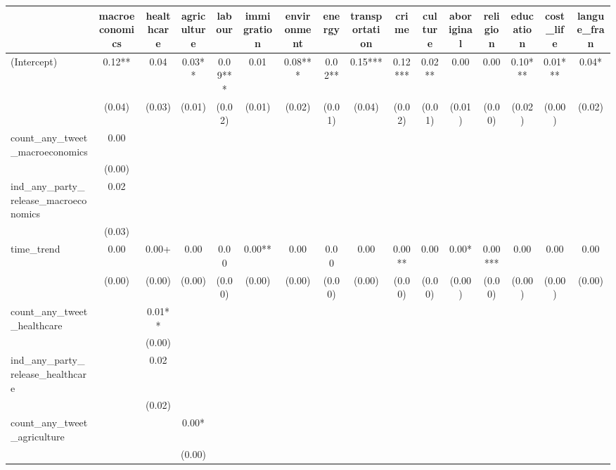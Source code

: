 \begin{table}
\centering
\begin{tabular}[t]{lccccccccccccccc}
\toprule
  & macroeconomics & healthcare & agriculture & labour & immigration & environment & energy & transportation & crime & culture & aboriginal & religion & education & cost\_life & langue\_fran\\
\midrule
(Intercept) & \num{0.12}** & \num{0.04} & \num{0.03}** & \num{0.09}*** & \num{0.01} & \num{0.08}*** & \num{0.02}** & \num{0.15}*** & \num{0.12}*** & \num{0.02}** & \num{0.00} & \num{0.00} & \num{0.10}*** & \num{0.01}*** & \num{0.04}*\\
 & (\num{0.04}) & (\num{0.03}) & (\num{0.01}) & (\num{0.02}) & (\num{0.01}) & (\num{0.02}) & (\num{0.01}) & (\num{0.04}) & (\num{0.02}) & (\num{0.01}) & (\num{0.01}) & (\num{0.00}) & (\num{0.02}) & (\num{0.00}) & (\num{0.02})\\
count\_any\_tweet\_macroeconomics & \num{0.00} &  &  &  &  &  &  &  &  &  &  &  &  &  & \\
 & (\num{0.00}) &  &  &  &  &  &  &  &  &  &  &  &  &  & \\
ind\_any\_party\_release\_macroeconomics & \num{0.02} &  &  &  &  &  &  &  &  &  &  &  &  &  & \\
 & (\num{0.03}) &  &  &  &  &  &  &  &  &  &  &  &  &  & \\
time\_trend & \num{0.00} & \num{0.00}+ & \num{0.00} & \num{0.00} & \num{0.00}** & \num{0.00} & \num{0.00} & \num{0.00} & \num{0.00}** & \num{0.00} & \num{0.00}* & \num{0.00}*** & \num{0.00} & \num{0.00} & \num{0.00}\\
 & (\num{0.00}) & (\num{0.00}) & (\num{0.00}) & (\num{0.00}) & (\num{0.00}) & (\num{0.00}) & (\num{0.00}) & (\num{0.00}) & (\num{0.00}) & (\num{0.00}) & (\num{0.00}) & (\num{0.00}) & (\num{0.00}) & (\num{0.00}) & (\num{0.00})\\
count\_any\_tweet\_healthcare &  & \num{0.01}** &  &  &  &  &  &  &  &  &  &  &  &  & \\
 &  & (\num{0.00}) &  &  &  &  &  &  &  &  &  &  &  &  & \\
ind\_any\_party\_release\_healthcare &  & \num{0.02} &  &  &  &  &  &  &  &  &  &  &  &  & \\
 &  & (\num{0.02}) &  &  &  &  &  &  &  &  &  &  &  &  & \\
count\_any\_tweet\_agriculture &  &  & \num{0.00}* &  &  &  &  &  &  &  &  &  &  &  & \\
 &  &  & (\num{0.00}) &  &  &  &  &  &  &  &  &  &  &  & \\

\end{tabular}
\end{table}
